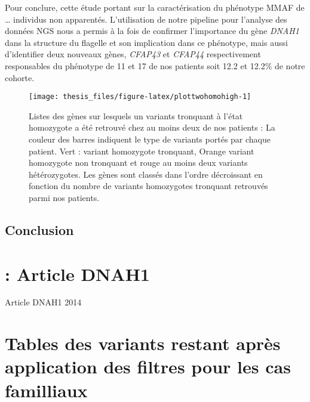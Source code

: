 \documentclass[12pt,twoside]{reedthesis}
\theoremstyle{definition}
\theoremstyle{definition}
\theoremstyle{remark}
\begin{document}
  Pour conclure, cette étude portant sur la caractérisation du phénotype
  MMAF de \ldots{} individus non apparentés. L'utilisation de notre
  pipeline pour l'analyse des données NGS nous a permis à la fois de
  confirmer l'importance du gène \emph{DNAH1} dans la structure du
  flagelle et son implication dans ce phénotype, mais aussi d'identifier
  deux nouveaux gènes, \emph{CFAP43} et \emph{CFAP44} respectivement
  responsables du phénotype de 11 et 17 de nos patients soit 12.2 et
  12.2\% de notre cohorte.
  
  \newpage
  
  \begin{figure}
  
  {\centering \texttt{[image: thesis\_files/figure-latex/plottwohomohigh-1]} 
  
  }
  
  \caption[Listes des gènes sur lesquels un variants tronquant à l'état homozygote a été retrouvé chez au moins deux de nos patients]{Listes des gènes sur lesquels un variants tronquant à l'état homozygote a été retrouvé chez au moins deux de nos patients : La couleur des barres indiquent le type de variants portés par chaque patient. Vert : variant homozygote tronquant, Orange variant homozygote non tronquant et rouge au moins deux variants hétérozygotes. Les gènes sont classés dans l'ordre décroissant en fonction du nombre de variants homozygotes tronquant retrouvés parmi nos patients.}\label{fig:plottwohomohigh}
  \end{figure}
  
  \newpage
  
  \section{Conclusion}\label{conclusion}
  
  \appendix
  
  \chapter{: Article DNAH1}\label{article-dnah1}
  
  Article DNAH1 2014
  
  \newpage
  
  \chapter{Tables des variants restant après application des filtres pour
  les cas
  familliaux}\label{tables-des-variants-restant-apres-application-des-filtres-pour-les-cas-familliaux}
  
\end{document}
